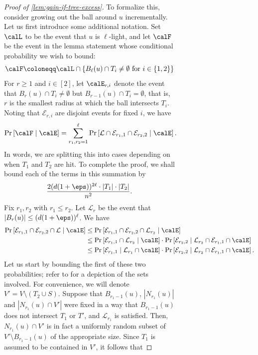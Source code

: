 \documentclass[11pt,letterpaper]{article}
\begin{document}
\begin{figure}
\begin{figure}
\begin{proof}[Proof of \cref{lem:gain-if-tree-excess}]
    To formalize this, consider growing out the ball around $u$ incrementally. 
    Let us first introduce some additional notation. 
    Set $\calL$ to be the event that $u$ is $\ell$-light, and let $\calF$ be the event in the lemma statement whose conditional probability we wish to bound: 
    \[
        \calF \coloneqq \calL \cap \{B_{\ell}(u) \cap T_i \ne \emptyset \text{ for } i \in \{1, 2\}\}
    \]For $r \ge 1$ and $i \in [2]$, let $\calE_{r, i}$ denote the event that $B_r(u) \cap T_i \ne \emptyset$ but $B_{r-1}(u) \cap T_i = \emptyset$, that is, $r$ is the smallest radius at which the ball intersects $T_i$. Noting that $\mathcal{E}_{r,i}$ are disjoint events for fixed $i$, we have
    \begin{equation}
        \Pr\left[ \calF \mid \calE \right] = \sum_{r_1,r_2=1}^{\ell} \Pr\left[ \mathcal{L} \cap \mathcal{E}_{r_1,1} \cap \mathcal{E}_{r_2,2} \mid \calE \right]. \label{eq:4.6-main}
    \end{equation}
    In words, we are splitting this into cases depending on when $T_1$ and $T_2$ are hit.
    To complete the proof, we shall bound each of the terms in this summation by
    \[ \frac{2(d(1+\eps))^{2\ell} \cdot |T_1| \cdot |T_2|}{n^2}. \]
    Fix $r_1,r_2$ with $r_1 \le r_2$. Let $\mathcal{L}_{r}$ be the event that $|B_{r}(u)| \le (d(1+\eps))^{\ell}$. We have
    \begin{align*}
        \Pr\left[ \mathcal{E}_{r_1,1} \cap \mathcal{E}_{r_2,2} \cap \mathcal{L} \mid \calE \right] &\le \Pr\left[ \mathcal{E}_{r_1,1} \cap \mathcal{E}_{r_2,2} \cap \mathcal{L}_{r_2} \mid \calE \right] \\
            &\le \Pr\left[ \mathcal{E}_{r_1,1} \cap \mathcal{L}_{r_2} \mid \calE \right] \cdot \Pr\left[ \mathcal{E}_{r_2,2} \mid \mathcal{L}_{r_2} \cap \mathcal{E}_{r_1,1} \cap \calE \right] \\
            &\le \Pr\left[ \mathcal{E}_{r_1,1} \mid \mathcal{L}_{r_1} \cap \calE \right] \cdot \Pr\left[ \mathcal{E}_{r_2,2} \mid \mathcal{L}_{r_2} \cap \mathcal{E}_{r_1,1} \cap \calE\right].
    \end{align*}
    Let us start by bounding the first of these two probabilities; refer to  for a depiction of the sets involved. For convenience, we will denote $V' = V \setminus (T_2 \cup S)$. 
    Suppose that $B_{r_1-1}(u)$, $|N_{r_1}(u)|$ and $|N_{r_1}(u) \cap V'|$ were fixed in a way that $B_{r_1-1}(u)$ does not intersect $T_1$ or $T'$, and $\mathcal{L}_{r_1}$ is satisfied. Then, $N_{r_1}(u) \cap V'$ is in fact a uniformly random subset of $V' \setminus B_{r_1-1}(u)$ of the appropriate size. Since $T_1$ is assumed to be contained in $V'$, it follows that

\end{proof}
\end{figure}
\end{figure}
\end{document}

